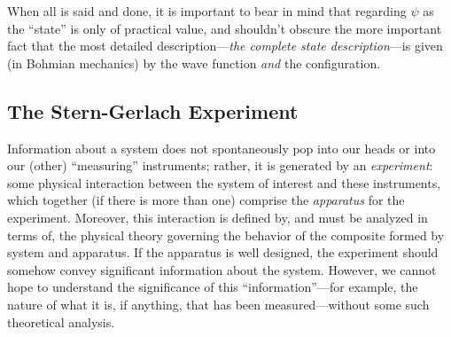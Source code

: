 \documentclass[12pt]{article}
\newcommand{\wf}{wave function}
\begin{document}
When all is said and done, it is important to bear in mind that
regarding $\psi$ as the ``state'' is only of practical value, and
shouldn't obscure the more important fact that the most detailed
description---\emph{the complete state description}---is given (in
Bohmian mechanics) by the \wf{} \emph{and} the configuration.

\subsection{The Stern-Gerlach Experiment}
\label{secSGE}
Information about a system does not spontaneously pop into our heads
or into our (other) ``measuring'' instruments; rather, it is generated
by an \emph{experiment}: some physical interaction between the system
of interest and these instruments, which together (if there is more
than one) comprise the \emph{apparatus} for the experiment.  Moreover,
this interaction is defined by, and must be analyzed in terms of, the
physical theory governing the behavior of the composite formed by
system and apparatus.  If the apparatus is well designed, the
experiment should somehow convey significant information about the
system.  However, we cannot hope to understand the significance of
this ``information''---for example, the nature of what it is, if
anything, that has been measured---without some such theoretical
analysis.
\end{document}
